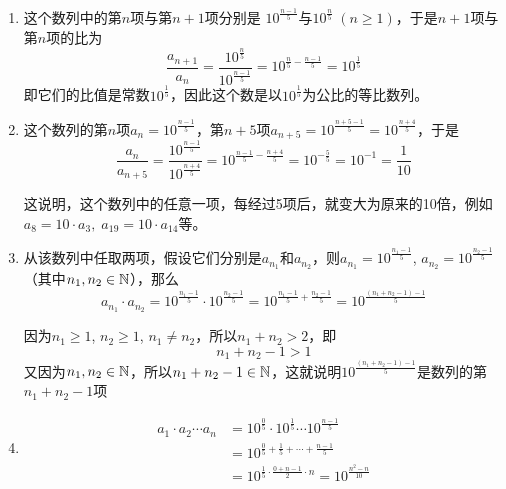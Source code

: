 \begin{solution}
\begin{enumerate}[(1)]
    \item 这个数列中的第$n$项与第$n+1$项分别是
$10^{\tfrac{n-1}{5}}$与$10^{\tfrac{n}{5}}\; (n\ge 1)$，于是$n+1$项与第$n$项的比为
\[\frac{a_{n+1}}{a_n}=\frac{10^{\tfrac{n}{5}}}{10^{\tfrac{n-1}{5}}}=10^{\tfrac{n}{5}-\tfrac{n-1}{5}}=10^{\tfrac{1}{5}}\]
即它们的比值是常数$10^{\tfrac{1}{5}}$，因此这个数是以$10^{\tfrac{1}{5}}$为公比的等比数列。

\item 这个数列的第$n$项$a_n=10^{\tfrac{n-1}{5}}$，第$n+5$项$a_{n+5}=10^{\tfrac{n+5-1}{5}}=10^{\tfrac{n+4}{5}}$，于是
\[\frac{a_n}{a_{n+5}}=\frac{10^{\tfrac{n-1}{5}}}{10^{\tfrac{n+4}{5}}}=10^{\tfrac{n-1}{5}-\tfrac{n+4}{5}}=10^{-\tfrac{5}{5}}=10^{-1}=\frac{1}{10}\]

这说明，这个数列中的任意一项，每经过5项后，就变大为原来的10倍，例如$a_8=10\cdot a_3,\; a_{19}=10\cdot a_{14}$等。

\item 从该数列中任取两项，假设它们分别是$a_{n_1}$和$a_{n_2}$，则$a_{n_1}=10^{\tfrac{n_1-1}{5}}$, $a_{n_2}=10^{\tfrac{n_2-1}{5}}$（其中$n_1,n_2\in\mathbb{N}$），那么
\[a_{n_1}\cdot a_{n_2}=10^{\tfrac{n_1-1}{5}}\cdot 10^{\tfrac{n_2-1}{5}}=10^{\tfrac{n_1-1}{5}+\tfrac{n_2-1}{5}}=10^{\tfrac{(n_1+n_2-1)-1}{5}}\]

因为$n_1\ge 1$, $n_2\ge 1$, $n_1\ne n_2$，所以$n_1+n_2>2$，即
\[n_1+n_2-1>1\]
又因为$n_1,n_2\in\mathbb{N}$，所以$n_1+n_2-1\in\mathbb{N}$，这就说明$10^{\tfrac{(n_1+n_2-1)-1}{5}}$是数列的第$n_1+n_2-1$项
\item 
\[\begin{split}
    a_1\cdot a_2\cdots a_n&=10^{\tfrac{0}{5}}\cdot 10^{\tfrac{1}{5}}\cdots 10^{\tfrac{n-1}{5}}\\
    &=10^{\tfrac{0}{5}+\tfrac{1}{5}+\cdots+\tfrac{n-1}{5}}\\&=10^{\tfrac{1}{5}\cdot \tfrac{0+n-1}{2}\cdot n}=10^{\tfrac{n^2-n}{10}}
\end{split}\]
\end{enumerate}
\end{solution}

